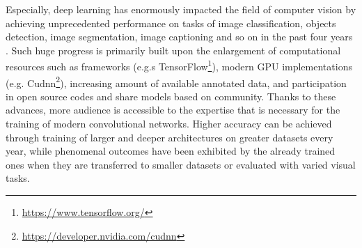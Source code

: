 
    Especially, deep learning has enormously impacted the field of computer vision by achieving unprecedented performance on tasks of image classification, objects detection, image segmentation, image captioning and so on in the past four years \cite{DBLP:journals/corr/GuWKMSSLWW15}. Such huge progress is primarily built upon the enlargement of computational resources such as frameworks (e.g.s TensorFlow\footnote{\url{https://www.tensorflow.org/}}), modern GPU implementations (e.g.  Cudnn\footnote{\url{https://developer.nvidia.com/cudnn}}), increasing amount of available annotated data, and participation in open source codes and share models based on community. Thanks to these advances, more audience is accessible to the expertise that is necessary for the training of modern convolutional networks. Higher accuracy can be achieved through training of larger and deeper architectures on greater datasets every year, while phenomenal outcomes have been exhibited by the already trained ones when they are transferred to smaller datasets or evaluated with varied visual tasks. 

